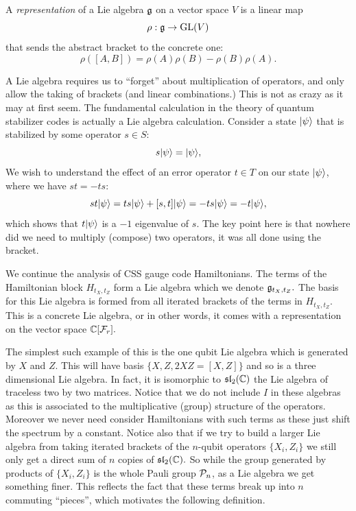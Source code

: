 \documentclass[12pt]{article}
\begin{document}
A \emph{representation} of a Lie algebra $\mathfrak{g}$
on a vector space $V$ 
is a linear map
$$
    \rho : \mathfrak{g} \to \mathrm{GL}(V)
$$
that sends the abstract bracket to the concrete one:
$$
    \rho([A, B]) = \rho(A)\rho(B) - \rho(B)\rho(A).
$$

A Lie algebra requires us to ``forget'' about
multiplication of operators, and only allow the taking of brackets
(and linear combinations.)
This is not as crazy as it may at first seem.
The fundamental calculation in the theory of
quantum stabilizer codes is actually
a Lie algebra calculation.
Consider a state $|{\psi}\rangle$
that is stabilized by some operator $s\in S:$
$$
    s|{\psi}\rangle = |{\psi}\rangle,
$$
We wish to understand the effect of an error operator $t\in T$
on our state $|{\psi}\rangle$, where we have $st = -ts:$
$$
    st|{\psi}\rangle = ts|{\psi}\rangle + [s, t]|{\psi}\rangle = -ts|{\psi}\rangle = -t|{\psi}\rangle,
$$
which shows that $t|{\psi}\rangle$ is a $-1$ eigenvalue of $s.$
The key point here is that nowhere did we need to multiply (compose) two operators,
it was all done using the bracket.

We continue the analysis of CSS gauge code Hamiltonians.
The terms of the Hamiltonian block $H_{t_X,t_Z}$
form a Lie algebra which we denote $\mathfrak{g}_{t_X,t_Z}.$
The basis for this Lie algebra is formed from all iterated 
brackets of the terms in $H_{t_X,t_Z}.$
This is a concrete Lie algebra, or in other words, it comes
with a representation on the vector space $\mathbb{C}[\mathcal{F}_{r}].$

The simplest such example of this is the one qubit Lie algebra
which is generated by $X$ and $Z.$
This will have basis $\{X, Z, 2XZ = [X, Z]\}$
and so is a three dimensional Lie algebra. In fact, it is isomorphic
to $\mathfrak{sl}_2(\mathbb{C})$ the Lie algebra of traceless two by two
matrices.
Notice that we do not include $I$ in these algebras as
this is associated to the multiplicative (group) structure
of the operators. Moreover we never need consider Hamiltonians
with such terms as these just shift the spectrum by a constant.
Notice also that if we try to build a larger Lie algebra
from taking iterated brackets of
the $n$-qubit operators $\{X_i, Z_i\}$ we still only get
a direct sum of $n$ copies of $\mathfrak{sl}_2(\mathbb{C}).$
So while the group generated by products of $\{X_i, Z_i\}$ is the
whole Pauli group $\mathcal{P}_n$, as a Lie algebra we get something finer.
This reflects the fact that these terms break up into $n$
commuting ``pieces'', which motivates the following definition. 
\end{document}
